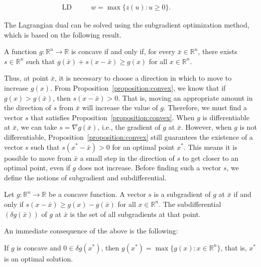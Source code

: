 \begin{align*}
	\text{LD } &  &  & w = \max \{z(u) : u \geq 0\}. &  &  &  &  & 
\end{align*}

The Lagrangian dual can be solved using the subgradient optimization method,
which is based on the following result.

\begin{proposition} \label{proposition:convex}
	A function $g : \mathbb{R}^n \rightarrow \mathbb{R}$ is concave if and only if, for every $\bar{x} \in \mathbb{R}^n$, there exists $s \in \mathbb{R}^n$ such that $g(\bar{x}) + s(x - \bar{x}) \geq g(x)$ for all $x \in \mathbb{R}^n$.
\end{proposition}

Thus, at point $\bar{x}$, it is necessary to choose a direction in which to move
to increase $g(x)$. From Proposition~\ref{proposition:convex}, we know that if
$g(x) > g(\bar{x})$, then $s(x - \bar{x}) > 0$. That is, moving an appropriate
amount in the direction of $s$ from $\bar{x}$ will increase the value of $g$.
Therefore, we must find a vector $s$ that satisfies
Proposition~\ref{proposition:convex}. When $g$ is differentiable at $\bar{x}$,
we can take $s = \nabla g(\bar{x})$, i.e., the gradient of $g$ at $\bar{x}$.
However, when $g$ is not differentiable, Proposition~\ref{proposition:convex}
still guarantees the existence of a vector $s$ such that $s(x^* - \bar{x}) > 0$
for an optimal point $x^*$. This means it is possible to move from $\bar{x}$ a
small step in the direction of $s$ to get closer to an optimal point, even if
$g$ does not increase. Before finding such a vector $s$, we define the notions
of subgradient and subdifferential.

\begin{definition}\label{definition:subgradient}
	Let $g : \mathbb{R}^n \rightarrow \mathbb{R}$ be a concave function. A vector $s$ is a subgradient of $g$ at $\bar{x}$ if and only if $s(x - \bar{x}) \geq g(x) - g(\bar{x})$ for all $x \in \mathbb{R}^n$. The subdifferential $(\delta g(\bar{x}))$ of $g$ at $\bar{x}$ is the set of all subgradients at that point.
\end{definition}

An immediate consequence of the above is the following:

\begin{proposition}\label{proposition:optimal}
	If $g$ is concave and $0 \in \delta g(x^*)$, then $g(x^*) = \max\{g(x) : x \in \mathbb{R}^n\}$, that is, $x^*$ is an optimal solution.
\end{proposition}

